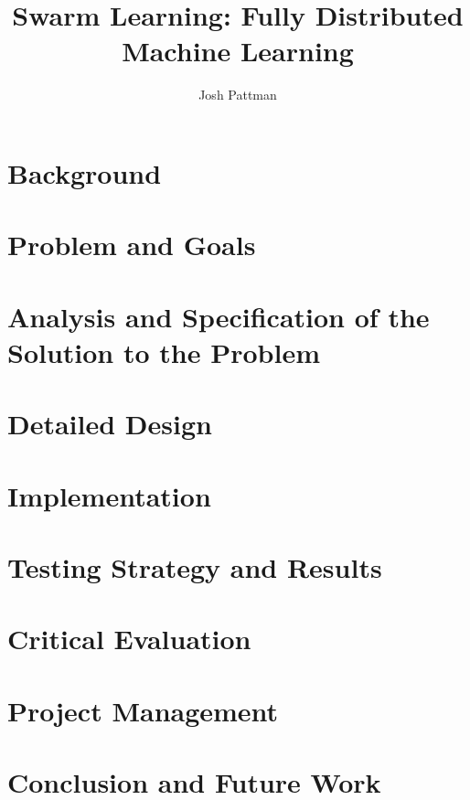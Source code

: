 \documentclass[12pt,a4paper]{report}
\author{Josh Pattman}
\title{Swarm Learning: Fully Distributed Machine Learning}
\begin{document}
	\maketitle
	\tableofcontents

	\chapter{Background}
	

	\chapter{Problem and Goals}
	
	
	\chapter{Analysis and Specification of the Solution to the Problem}
	
	\chapter{Detailed Design}
	
	
	\chapter{Implementation}
	
	
	\chapter{Testing Strategy and Results}
	
	
	\chapter{Critical Evaluation}
	
	
	\chapter{Project Management}
	
	\chapter{Conclusion and Future Work}
	
	
	
	
	{}
	
\end{document}
